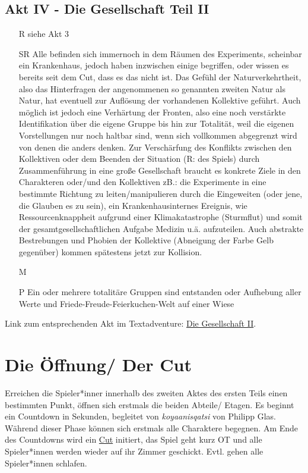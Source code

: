 \documentclass[12pt, a4paper, openany]{report}
\begin{document}
\subsection{Akt IV - Die Gesellschaft Teil II}
\begin{itemize} 
\item[R]siehe Akt 3
\item[SR] Alle befinden sich immernoch in dem Räumen des Experiments, scheinbar ein Krankenhaus, jedoch haben inzwischen einige begriffen, oder wissen es bereits seit dem Cut, dass es das nicht ist. Das Gefühl der Naturverkehrtheit, also das Hinterfragen der angenommenen so genannten zweiten Natur als Natur, hat eventuell zur Auflösung der vorhandenen Kollektive geführt. Auch möglich ist jedoch eine Verhärtung der Fronten, also eine noch verstärkte Identifikation über die eigene Gruppe bis hin zur Totalität, weil die eigenen Vorstellungen nur noch haltbar sind, wenn sich vollkommen abgegrenzt wird von denen die anders denken. Zur Verschärfung des Konflikts zwischen den Kollektiven oder dem Beenden der Situation (R: des Spiels) durch Zusammenführung in eine große Gesellschaft braucht es konkrete Ziele in den Charakteren oder/und den Kollektiven zB.: die Experimente in eine bestimmte Richtung zu leiten/manipulieren durch die Eingeweiten (oder jene, die Glauben es zu sein), ein Krankenhausinternes Ereignis, wie Ressourcenknappheit aufgrund einer Klimakatastrophe (Sturmflut) und somit der \glqq gesamtgesellschaftlichen \grqq{} Aufgabe Medizin u.ä. aufzuteilen. Auch abstrakte Bestrebungen und Phobien der Kollektive (Abneigung der Farbe Gelb gegenüber) kommen spätestens jetzt zur Kollision. 
\item[M] 
\item[P]Ein oder mehrere totalitäre Gruppen sind entstanden oder Aufhebung aller Werte und Friede-Freude-Feierkuchen-Welt auf einer Wiese
\end{itemize}

Link zum entsprechenden Akt im Textadventure: \hyperref[die-gesellschaft2]{Die Gesellschaft II}.


\section{Die Öffnung/ Der Cut} \label{die-öffnung}
Erreichen die Spieler*inner innerhalb des zweiten Aktes des ersten Teils einen bestimmten Punkt, öffnen sich erstmals die beiden Abteile/ Etagen. 
Es beginnt ein Countdown in Sekunden, begleitet von \textit{koyaanisqatsi} von Philipp Glas. 
Während dieser Phase können sich erstmals alle Charaktere begegnen. 
Am Ende des Countdowns wird ein \hyperref[cut]{Cut} initiert, das Spiel geht kurz OT und alle Spieler*innen werden wieder auf ihr Zimmer geschickt. 
Evtl. gehen alle Spieler*innen schlafen.  
\end{document}
